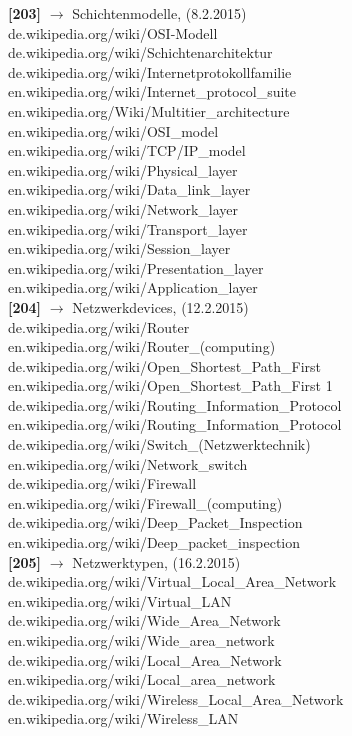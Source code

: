 \documentclass[12pt,a4paper]{report}
\begin{document}
\begin{onehalfspace}
\noindent
\textbf{[203]} $\rightarrow$  Schichtenmodelle, (8.2.2015)\\
de.wikipedia.org/wiki/OSI-Modell\\
de.wikipedia.org/wiki/Schichtenarchitektur\\
de.wikipedia.org/wiki/Internetprotokollfamilie\\
en.wikipedia.org/wiki/Internet\_protocol\_suite\\
en.wikipedia.org/Wiki/Multitier\_architecture\\
en.wikipedia.org/wiki/OSI\_model\\
en.wikipedia.org/wiki/TCP/IP\_model\\
en.wikipedia.org/wiki/Physical\_layer\\
en.wikipedia.org/wiki/Data\_link\_layer\\
en.wikipedia.org/wiki/Network\_layer\\
en.wikipedia.org/wiki/Transport\_layer\\
en.wikipedia.org/wiki/Session\_layer\\
en.wikipedia.org/wiki/Presentation\_layer\\
en.wikipedia.org/wiki/Application\_layer\\

\noindent
\textbf{[204]} $\rightarrow$  Netzwerkdevices, (12.2.2015)\\
de.wikipedia.org/wiki/Router\\
en.wikipedia.org/wiki/Router\_(computing)\\
de.wikipedia.org/wiki/Open\_Shortest\_Path\_First \\
en.wikipedia.org/wiki/Open\_Shortest\_Path\_First 1\\
de.wikipedia.org/wiki/Routing\_Information\_Protocol \\
en.wikipedia.org/wiki/Routing\_Information\_Protocol \\
de.wikipedia.org/wiki/Switch\_(Netzwerktechnik) \\
en.wikipedia.org/wiki/Network\_switch \\
de.wikipedia.org/wiki/Firewall \\
en.wikipedia.org/wiki/Firewall\_(computing) \\
de.wikipedia.org/wiki/Deep\_Packet\_Inspection \\
en.wikipedia.org/wiki/Deep\_packet\_inspection \\

\noindent
\textbf{[205]} $\rightarrow$  Netzwerktypen, (16.2.2015)\\
de.wikipedia.org/wiki/Virtual\_Local\_Area\_Network \\
en.wikipedia.org/wiki/Virtual\_LAN \\
de.wikipedia.org/wiki/Wide\_Area\_Network\\
en.wikipedia.org/wiki/Wide\_area\_network \\
de.wikipedia.org/wiki/Local\_Area\_Network \\
en.wikipedia.org/wiki/Local\_area\_network \\
de.wikipedia.org/wiki/Wireless\_Local\_Area\_Network \\
en.wikipedia.org/wiki/Wireless\_LAN \\


\end{onehalfspace}
\end{document}
